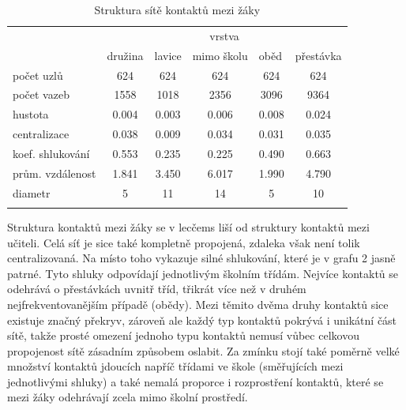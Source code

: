 \begin{table}[]
    \centering
    \caption{Struktura sítě kontaktů mezi žáky}
\begin{tabular}{lccccc}
\hline
                 & \multicolumn{5}{c}{vrstva}                                                                                                                           \\ 
                 & \multicolumn{1}{l}{družina} & \multicolumn{1}{l}{lavice} & \multicolumn{1}{l}{mimo školu} & \multicolumn{1}{l}{oběd} & \multicolumn{1}{l}{přestávka} \\ \hline
počet uzlů       & 624                         & 624                        & 624                            & 624                      & 624                           \\
počet vazeb      & 1558                        & 1018                       & 2356                           & 3096                     & 9364                          \\
hustota          & 0.004                       & 0.003                      & 0.006                          & 0.008                    & 0.024                         \\
centralizace     & 0.038                       & 0.009                      & 0.034                          & 0.031                    & 0.035                         \\
koef. shlukování & 0.553                       & 0.235                      & 0.225                          & 0.490                    & 0.663                         \\
prům. vzdálenost & 1.841                       & 3.450                      & 6.017                          & 1.990                    & 4.790                         \\
diametr          & 5                           & 11                         & 14                             & 5                        & 10                            \\ \hline
\label{tab:100-students}
\end{tabular}
\end{table}

Struktura kontaktů mezi žáky se v lecčems liší od struktury kontaktů mezi učiteli. Celá síť je sice také kompletně propojená, zdaleka však není tolik centralizovaná. Na místo toho vykazuje silné shlukování, které je v grafu 2 jasně patrné. Tyto shluky odpovídají jednotlivým školním třídám. Nejvíce kontaktů se odehrává o přestávkách uvnitř tříd, třikrát více než v druhém nejfrekventovanějším případě (obědy). Mezi těmito dvěma druhy kontaktů sice existuje značný překryv, zároveň ale každý typ kontaktů pokrývá i unikátní část sítě, takže prosté omezení jednoho typu kontaktů nemusí vůbec celkovou propojenost sítě zásadním způsobem oslabit. Za zmínku stojí také poměrně velké množství kontaktů jdoucích napříč třídami ve škole (směřujících mezi jednotlivými shluky) a také nemalá proporce i rozprostření kontaktů, které se mezi žáky odehrávají zcela mimo školní prostředí. 

